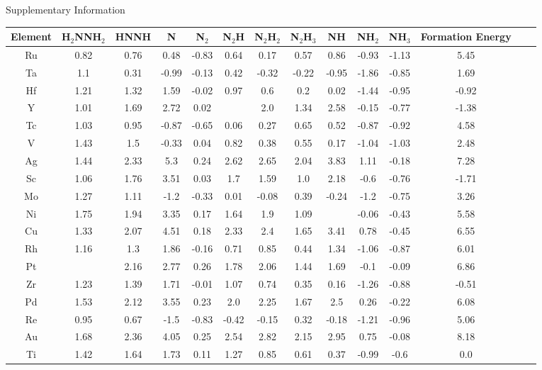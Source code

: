 Supplementary Information
\onecolumn
\begin{table}
\begin{center}
\begin{tabular}{| c | c | c | c | c | c | c | c | c | c | c | c | c | c |}
\hline
Element & H$_2$NNH$_2$ & HNNH & N & N$_2$ & N$_2$H & N$_2$H$_2$ & N$_2$H$_3$ & NH & NH$_2$ & NH$_3$ & Formation Energy\\
\hline

Ru & 0.82 & 0.76 & 0.48 & -0.83 & 0.64 & 0.17 & 0.57 & 0.86 & -0.93 & -1.13 & 5.45 \\
Ta & 1.1 & 0.31 & -0.99 & -0.13 & 0.42 & -0.32 & -0.22 & -0.95 & -1.86 & -0.85 & 1.69 \\
Hf & 1.21 & 1.32 & 1.59 & -0.02 & 0.97 & 0.6 & 0.2 & 0.02 & -1.44 & -0.95 & -0.92 \\
Y & 1.01 & 1.69 & 2.72 & 0.02 &  & 2.0 & 1.34 & 2.58 & -0.15 & -0.77 & -1.38 \\
Tc & 1.03 & 0.95 & -0.87 & -0.65 & 0.06 & 0.27 & 0.65 & 0.52 & -0.87 & -0.92 & 4.58 \\
V & 1.43 & 1.5 & -0.33 & 0.04 & 0.82 & 0.38 & 0.55 & 0.17 & -1.04 & -1.03 & 2.48 \\
Ag & 1.44 & 2.33 & 5.3 & 0.24 & 2.62 & 2.65 & 2.04 & 3.83 & 1.11 & -0.18 & 7.28 \\
Sc & 1.06 & 1.76 & 3.51 & 0.03 & 1.7 & 1.59 & 1.0 & 2.18 & -0.6 & -0.76 & -1.71 \\
Mo & 1.27 & 1.11 & -1.2 & -0.33 & 0.01 & -0.08 & 0.39 & -0.24 & -1.2 & -0.75 & 3.26 \\
Ni & 1.75 & 1.94 & 3.35 & 0.17 & 1.64 & 1.9 & 1.09 &  & -0.06 & -0.43 & 5.58 \\
Cu & 1.33 & 2.07 & 4.51 & 0.18 & 2.33 & 2.4 & 1.65 & 3.41 & 0.78 & -0.45 & 6.55 \\
Rh & 1.16 & 1.3 & 1.86 & -0.16 & 0.71 & 0.85 & 0.44 & 1.34 & -1.06 & -0.87 & 6.01 \\
Pt &  & 2.16 & 2.77 & 0.26 & 1.78 & 2.06 & 1.44 & 1.69 & -0.1 & -0.09 & 6.86 \\
Zr & 1.23 & 1.39 & 1.71 & -0.01 & 1.07 & 0.74 & 0.35 & 0.16 & -1.26 & -0.88 & -0.51 \\
Pd & 1.53 & 2.12 & 3.55 & 0.23 & 2.0 & 2.25 & 1.67 & 2.5 & 0.26 & -0.22 & 6.08 \\
Re & 0.95 & 0.67 & -1.5 & -0.83 & -0.42 & -0.15 & 0.32 & -0.18 & -1.21 & -0.96 & 5.06 \\
Au & 1.68 & 2.36 & 4.05 & 0.25 & 2.54 & 2.82 & 2.15 & 2.95 & 0.75 & -0.08 & 8.18 \\
Ti & 1.42 & 1.64 & 1.73 & 0.11 & 1.27 & 0.85 & 0.61 & 0.37 & -0.99 & -0.6 & 0.0 \\

\end{tabular}
\end{center}
\end{table}
